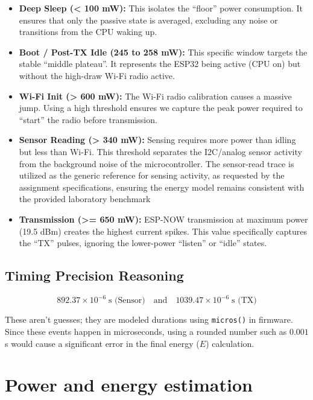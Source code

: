 \documentclass[11pt,a4paper]{article}
\begin{document}
\begin{itemize}

\item \textbf{Deep Sleep (< 100 mW):} This isolates the ``floor'' power consumption. 
It ensures that only the passive state is averaged, excluding any noise or transitions 
from the CPU waking up.

\item \textbf{Boot / Post-TX Idle (245 to 258 mW):} This specific window targets the 
stable ``middle plateau''. It represents the ESP32 being active (CPU on) but without 
the high-draw Wi-Fi radio active.

\item \textbf{Wi-Fi Init (> 600 mW):} The Wi-Fi radio calibration causes a massive 
jump. Using a high threshold ensures we capture the peak power required to 
``start'' the radio before transmission.

\item \textbf{Sensor Reading (> 340 mW):} Sensing requires more power than idling 
but less than Wi-Fi. This threshold separates the I2C/analog sensor activity 
from the background noise of the microcontroller.
The sensor-read trace is utilized as the generic reference for sensing activity, as requested by the assignment specifications, ensuring the energy model remains consistent with the provided laboratory benchmark
\item \textbf{Transmission (>= 650 mW):} ESP-NOW transmission at maximum power 
(19.5 dBm) creates the highest current spikes. This value specifically captures 
the ``TX'' pulses, ignoring the lower-power ``listen'' or ``idle'' states.

\end{itemize}

\subsection*{Timing Precision Reasoning}

\[
892.37 \times 10^{-6} \; \text{s (Sensor)} 
\quad \text{and} \quad 
1039.47 \times 10^{-6} \; \text{s (TX)}
\]

These aren't guesses; they are modeled durations using \texttt{micros()} in firmware. 
Since these events happen in microseconds, using a rounded number such as $0.001$ s 
would cause a significant error in the final energy ($E$) calculation.
\section{Power and energy estimation}
\end{document}
